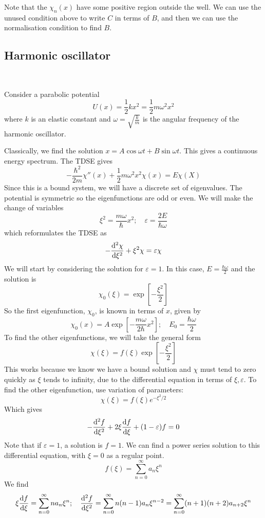 \documentclass[a4paper]{article}
\begin{document}
Note that the \( \chi_n(x) \) have some positive region outside the well.
We can use the unused condition above to write \( C \) in terms of \( B \), and then we can use the normalisation condition to find \( B \).

\subsection{Harmonic oscillator}\ \vspace*{-1.5em}
\begin{example}
    Consider a parabolic potential
\[
	U(x) = \frac{1}{2} kx^2 = \frac{1}{2} m \omega^2 x^2
\]
where \( k \) is an elastic constant and \( \omega = \sqrt{\frac{k}{m}} \) is the angular frequency of the harmonic oscillator.
\end{example}
Classically, we find the solution \( x = A \cos \omega t + B \sin \omega t \).
This gives a continuous energy spectrum.
The TDSE gives
\[
	-\frac{\hbar^2}{2m} \chi''(x) + \frac{1}{2} m\omega^2 x^2 \chi(x) = E \chi(X)
\]
Since this is a bound system, we will have a discrete set of eigenvalues.
The potential is symmetric so the eigenfunctions are odd or even.
We will make the change of variables
\[
	\xi^2 = \frac{m\omega}{\hbar} x^2;\quad \varepsilon = \frac{2E}{\hbar \omega}
\]
which reformulates the TDSE as
\[
	-\dv[2]{\chi}{\xi} + \xi^2 \chi = \varepsilon \chi
\]
We will start by considering the solution for \( \varepsilon = 1 \).
In this case, \( E = \frac{\hbar \omega}{2} \) and the solution is
\[
	\chi_0(\xi) = \exp[-\frac{\xi^2}{2}]
\]
So the first eigenfunction, \( \chi_0 \), is known in terms of \( x \), given by
\[
	\chi_0(x) = A \exp[-\frac{m\omega}{2\hbar}x^2];\quad E_0 = \frac{\hbar \omega}{2}
\]
To find the other eigenfunctions, we will take the general form
\[
	\chi(\xi) = f(\xi) \exp[-\frac{\xi^2}{2}]
\]
This works because we know we have a bound solution and \( \chi \) must tend to zero quickly as \( \xi \) tends to infinity, due to the differential equation in terms of \( \xi, \varepsilon \).
To find the other eigenfunction, use variation of parameters: 
\[
    \chi(\xi) = f(\xi) e^{-\xi^2/2}
\]
Which gives
\[
	-\dv[2]{f}{\xi} + 2\xi \dv{f}{\xi} + (1-\varepsilon)f = 0
\]
Note that if \( \varepsilon = 1 \), a solution is \( f = 1 \).
We can find a power series solution to this differential equation, with \( \xi = 0 \) as a regular point.
\[
	f(\xi) = \sum_{n=0}^\infty a_n \xi^n
\]
We find
\[
	\xi \dv{f}{\xi} = \sum_{n=0}^\infty n a_n \xi^n;\quad \dv[2]{f}{\xi} = \sum_{n=0}^\infty n(n-1)a_n \xi^{n-2} = \sum_{n=0}^\infty (n+1)(n+2)a_{n+2}\xi^n
\]
\end{document}
